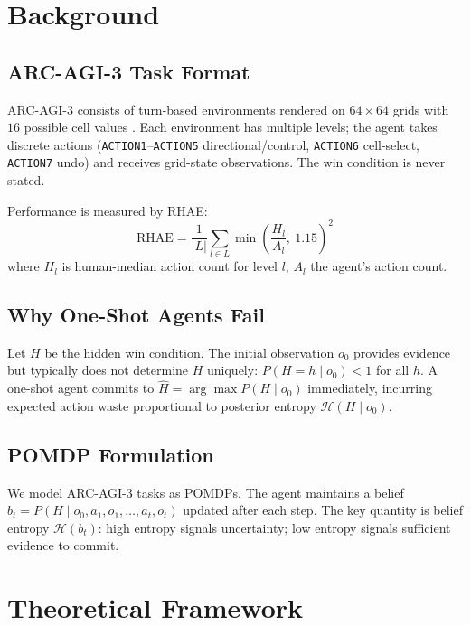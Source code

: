 \documentclass[11pt]{article}
\begin{document}
\section{Background}
\label{sec:background}

\subsection{ARC-AGI-3 Task Format}

ARC-AGI-3 consists of turn-based environments rendered on $64{\times}64$ grids with $16$ possible cell values \cite{arcprize2026}. Each environment has multiple levels; the agent takes discrete actions (\texttt{ACTION1}--\texttt{ACTION5} directional/control, \texttt{ACTION6} cell-select, \texttt{ACTION7} undo) and receives grid-state observations. The win condition is never stated.

Performance is measured by RHAE:
\begin{equation}
\text{RHAE} = \frac{1}{|L|} \sum_{l \in L} \min\!\left(\frac{H_l}{A_l},\ 1.15\right)^2
\label{eq:rhae}
\end{equation}
where $H_l$ is human-median action count for level $l$, $A_l$ the agent's action count.

\subsection{Why One-Shot Agents Fail}

Let $H$ be the hidden win condition. The initial observation $o_0$ provides evidence but typically does not determine $H$ uniquely: $P(H{=}h \mid o_0) < 1$ for all $h$. A one-shot agent commits to $\hat{H} = \arg\max P(H \mid o_0)$ immediately, incurring expected action waste proportional to posterior entropy $\mathcal{H}(H \mid o_0)$.

\subsection{POMDP Formulation}

We model ARC-AGI-3 tasks as POMDPs. The agent maintains a belief $b_t = P(H \mid o_0, a_1, o_1, \ldots, a_t, o_t)$ updated after each step. The key quantity is belief entropy $\mathcal{H}(b_t)$: high entropy signals uncertainty; low entropy signals sufficient evidence to commit.

\section{Theoretical Framework}
\label{sec:theory}
\end{document}
